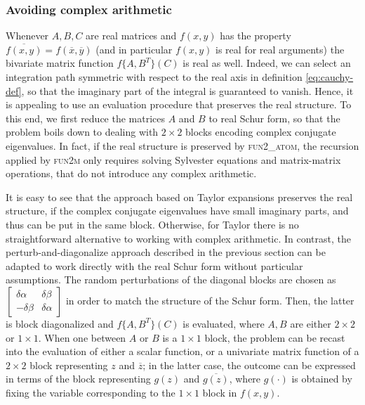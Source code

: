 \documentclass{siamart1116}
\begin{document}
\subsubsection{Avoiding complex arithmetic}
Whenever $A,B,C$ are real matrices and $f(x,y)$ has the 
property $\overline{f(x,y)}= f(\overline x,\overline y)$ (and 
in particular $f(x,y)$ is real for real arguments)
the bivariate matrix function $f\{A,B^T\}(C)$ is real as well. 
Indeed, we can select an integration path symmetric with respect
to the real axis in definition \eqref{eq:cauchy-def}, so that the
imaginary part of the integral is guaranteed to vanish. Hence, it 
is appealing to use an evaluation procedure that preserves 
the real structure. To this end, we first reduce the matrices 
$A$ and $B$ to real Schur form, so that the problem boils down
to dealing with
$2 \times 2$ blocks encoding complex conjugate eigenvalues. In 
fact, if the real structure is preserved by \textsc{fun2\_atom}, 
the recursion applied by \textsc{fun2m} only
requires solving Sylvester equations and matrix-matrix operations, 
that do not introduce any complex arithmetic. 

It is easy to see that the approach based on Taylor expansions preserves the real structure, if 
the complex conjugate eigenvalues have small imaginary parts, and thus can be put in the same block. 
Otherwise, for Taylor there is no straightforward alternative to working with complex arithmetic. 
In contrast, the perturb-and-diagonalize approach described in the previous section can be adapted to work directly with the real Schur form
without particular assumptions. 
The random perturbations of the diagonal blocks are chosen as $\left[\begin{smallmatrix}
	\delta\alpha&\delta\beta\\ -\delta\beta&\delta\alpha
	\end{smallmatrix}\right]$ in order to match the structure of the Schur form. %
Then, the latter is block diagonalized and 
$f\{ A, B^T\}(C)$ is evaluated, where $A,B$ are either $2 \times 2$ or
$1 \times 1$. When one between $A$ or $B$ is a $1 \times 1$ block, 
the problem can be recast into the evaluation of either 
a scalar function, or a univariate matrix
function
of a $2 \times 2$ block representing $z$ and $\overline{z}$; in the
latter case, 
the outcome can be expressed in terms of the block representing 
$g(z)$ and $\overline{g(z)}$, where $g(\cdot)$ is obtained by 
fixing the variable corresponding to the $1 \times 1$ block in $f(x,y)$. 
\end{document}
